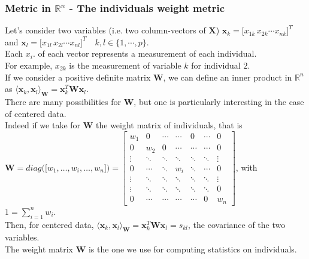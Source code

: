 \begin{notechapter}
\subsubsection{Metric in $\mathbb{R}^n$ - The individuals weight metric}
Let's consider two variables (i.e. two column-vectors of $\mathbf{X}$) $\mathbf{x}_{k} = \big[x_{{1}{k}} \, x_{{2}{k}} \cdots x_{{n}{k}} \big]^{T}$
and $\mathbf{x}_{l} = \big[x_{{1}{l}} \, x_{{2}{l}} \cdots x_{{n}{l}} \big]^{T}\quad k, l \in \{1,\cdots,p\}$.\\[6pt]
Each $x_{i}{.}$ of each vector represents a measurement of each individual.\\[5pt]
For example, $x_{{2}{k}}$ is the measurement of variable $k$ for individual $2$.\\[5pt]
%
If we consider a positive definite matrix $\mathbf{W}$, we can define an inner product in $\mathbb{R}^n$ as 
$\langle \mathbf{x}_{k}, \mathbf{x}_{l} \rangle_{\textbf{W}} = \mathbf{x}_{k}^{T}\textbf{W}\mathbf{x}_{l}$.\\[5pt]
There are many possibilities for $\mathbf{W}$, but one is particularly interesting in the case of centered data.\\[5pt]
Indeed if we take for $\mathbf{W}$ the weight matrix of individuals, that is \\[5pt]
$\textbf{W} = diag \big( \big[ w_1, \dots, w_i,\dots, w_n \big] \big) = 
\begin{bmatrix*}
    w_1 & 0    & \cdots  & \cdots  & 0 & \cdots & 0      \\
            0 & w_2 & 0  & \cdots  & \cdots & \cdots & 0      \\
        \vdots & \ddots & \ddots  & \ddots & \ddots & \ddots & \vdots \\
            0 & \cdots  & \ddots  & w_i & \ddots & \cdots & 0      \\
        \vdots & \ddots  & \ddots  & \ddots  & \ddots & \ddots & \vdots \\
        \vdots & \ddots  & \ddots  & \ddots  & \ddots & \ddots & 0      \\
            0 & \cdots    & \cdots  & \cdots  & \cdots & 0      & w_n
\end{bmatrix*}$, with $1 = \displaystyle\sum\limits_{i=1}^{n}w_i$. \\[10pt]
%
Then, for centered data,
$\langle \mathbf{x}_{k}, \mathbf{x}_{l} \rangle_{\textbf{W}} = \mathbf{x}_{k}^{T}\textbf{W}\mathbf{x}_{l} = s_{{k}{l}}$, 
the covariance of the two variables.\\[6pt]
%
The weight matrix $\mathbf{W}$ is the one we use for computing statistics on individuals.\\[5pt]

\end{notechapter}
